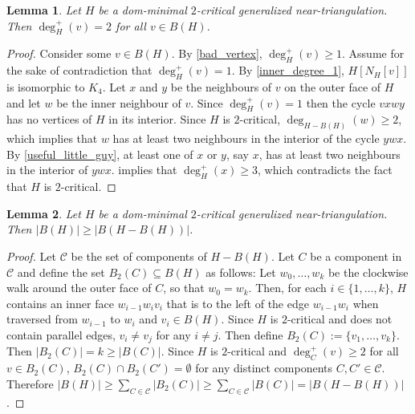 \documentclass[11pt]{article}
\newcommand{\pat}[1]{\textcolor{red}{PM: #1}}
\newcommand{\hussein}[1]{\textcolor{purple}{HH: #1}}
\newtheorem{lem}{Lemma}
\theoremstyle{definition}
\begin{document}

\begin{lem}
  Let $H$ be a dom-minimal $2$-critical generalized near-triangulation.  Then $\deg^+_H(v)=2$ for all $v\in B(H)$.
\end{lem}

\begin{proof}
  Consider some $v\in B(H)$. By \cref{bad_vertex}, $\deg^+_H(v)\ge 1$. Assume for the sake of contradiction that $\deg^+_H(v)=1$. By \cref{inner_degree_1}, $H[N_H[v]]$ is isomorphic to $K_4$. Let $x$ and $y$ be the neighbours of $v$ on the outer face of $H$ and let $w$ be the inner neighbour of $v$. Since $\deg^+_H(v)=1$ then the cycle $vxwy$ has no vertices of $H$ in its interior.  Since $H$ is $2$-critical, $\deg_{H-B(H)}(w)\ge 2$, which implies that $w$ has at least two neighbours in the interior of the cycle $ywx$.  By \cref{useful_little_guy}, at least one of $x$ or $y$, say $x$, has at least two neighbours in the interior of $ywx$.   implies that $\deg^+_H(x)\ge 3$, which contradicts the fact that $H$ is $2$-critical.
\end{proof}


\begin{lem}\label{two_critical_boundary_size}
  Let $H$ be a dom-minimal $2$-critical generalized near-triangulation.  Then $|B(H)|\ge |B(H-B(H))|$.
\end{lem}

\begin{proof}
  Let $\mathcal{C}$ be the set of components of $H-B(H)$.
  Let $C$ be a component in $\mathcal{C}$ and define the set $B_2(C)\subseteq B(H)$ as follows: Let $w_0,\ldots,w_k$ be the clockwise walk around the outer face of $C$, so that $w_0=w_k$.  Then, for each $i\in\{1,\ldots,k\}$, $H$ contains an inner face $w_{i-1}w_iv_i$ that is to the left of the edge $w_{i-1}w_i$ when traversed from $w_{i-1}$ to $w_i$ and $v_i\in B(H)$.  Since $H$ is $2$-critical and does not contain parallel edges, $v_i\neq v_j$ for any $i\neq j$. Then define $B_2(C):=\{v_1,\ldots,v_k\}$.  Then $|B_2(C)|= k\ge |B(C)|$. Since $H$ is $2$-critical and $\deg^+_C(v)\ge 2$ for all $v\in B_2(C)$, $B_2(C)\cap B_2(C')=\emptyset$ for any distinct components $C,C'\in\mathcal{C}$.  Therefore $|B(H)|\ge \sum_{C\in\mathcal{C}} |B_2(C)|\ge \sum_{C\in\mathcal{C}} |B(C)|=|B(H-B(H))|$.
\end{proof}
\end{document}
